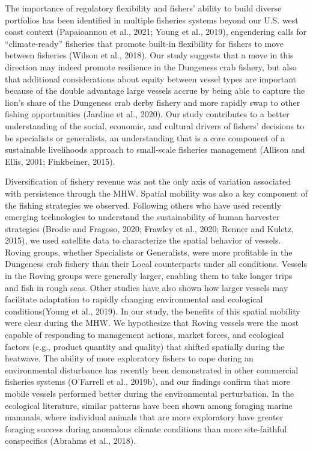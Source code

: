 \documentclass[]{elsarticle} %
\begin{document}
The importance of regulatory flexibility and fishers' ability to build
diverse portfolios has been identified in multiple fisheries systems
beyond our U.S. west coast context (Papaioannou et al., 2021; Young et
al., 2019), engendering calls for ``climate-ready'' fisheries that
promote built-in flexibility for fishers to move between fisheries
(Wilson et al., 2018). Our study suggests that a move in this direction
may indeed promote resilience in the Dungeness crab fishery, but also
that additional considerations about equity between vessel types are
important because of the double advantage large vessels accrue by being
able to capture the lion's share of the Dungeness crab derby fishery and
more rapidly swap to other fishing opportunities (Jardine et al., 2020).
Our study contributes to a better understanding of the social, economic,
and cultural drivers of fishers' decisions to be specialists or
generalists, an understanding that is a core component of a sustainable
livelihoods approach to small-scale fisheries management (Allison and
Ellis, 2001; Finkbeiner, 2015).

Diversification of fishery revenue was not the only axis of variation
associated with persistence through the MHW. Spatial mobility was also a
key component of the fishing strategies we observed. Following others
who have used recently emerging technologies to understand the
sustainability of human harvester strategies (Brodie and Fragoso, 2020;
Frawley et al., 2020; Renner and Kuletz, 2015), we used satellite data
to characterize the spatial behavior of vessels. Roving groups, whether
Specialists or Generalists, were more profitable in the Dungeness crab
fishery than their Local counterparts under all conditions. Vessels in
the Roving groups were generally larger, enabling them to take longer
trips and fish in rough seas. Other studies have also shown how larger
vessels may facilitate adaptation to rapidly changing environmental and
ecological conditions(Young et al., 2019). In our study, the benefits of
this spatial mobility were clear during the MHW. We hypothesize that
Roving vessels were the most capable of responding to management
actions, market forces, and ecological factors (e.g., product quantity
and quality) that shifted spatially during the heatwave. The ability of
more exploratory fishers to cope during an environmental disturbance has
recently been demonstrated in other commercial fisheries systems
(O'Farrell et al., 2019b), and our findings confirm that more mobile
vessels performed better during the environmental perturbation. In the
ecological literature, similar patterns have been shown among foraging
marine mammals, where individual animals that are more exploratory have
greater foraging success during anomalous climate conditions than more
site-faithful conspecifics (Abrahms et al., 2018).
\end{document}
